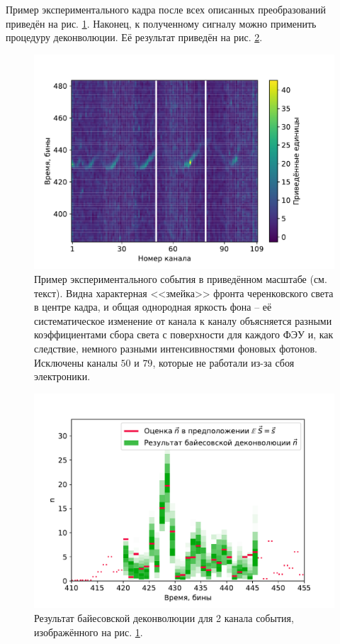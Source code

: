 \documentclass[12pt]{book}
\begin{document}
	Пример экспериментального кадра после всех описанных преобразований приведён на рис. \ref{pic:experimental-frame-example}. Наконец, к полученному сигналу можно применить процедуру деконволюции. Её результат приведён на рис. \ref{pic:experimental-signal-deconvolution-example}.

	\begin{figure}
		\centering
		\includegraphics[width=\columnwidth]{experimental-frame-example}
		\caption{Пример экспериментального события в приведённом масштабе (см. текст). Видна характерная <<змейка>> фронта черенковского света в центре кадра, и общая однородная яркость фона -- её систематическое изменение от канала к каналу объясняется разными коэффициентами сбора света с поверхности для каждого ФЭУ и, как следствие, немного разными интенсивностями фоновых фотонов. Исключены каналы $50$ и $79$, которые не работали из-за сбоя электроники.}
		\label{pic:experimental-frame-example}
	\end{figure}

	\begin{figure}
		\centering
		\includegraphics[width=\columnwidth]{experimental-signal-deconvolution-example}
		\caption{Результат байесовской деконволюции для 2 канала события, изображённого на рис. \ref{pic:experimental-frame-example}.}
		\label{pic:experimental-signal-deconvolution-example}
	\end{figure}
\end{document}
